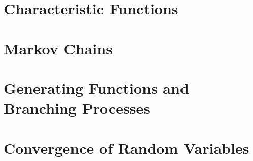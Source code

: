 \documentclass[12pt]{article}
\theoremstyle{definition}
\theoremstyle{remark}
\numberwithin{equation}{section}
\begin{document}
  \section{Characteristic Functions}%
  \label{sec:characteristic_functions}
  
  \section{Markov Chains}%
  \label{sec:markov_chains}
  
  \section{Generating Functions and Branching Processes}%
  \label{sec:generating_functions_and_branching_processes}
  
  \section{Convergence of Random Variables}%
  \label{sec:convergence_of_random_variables} 
\end{document}
